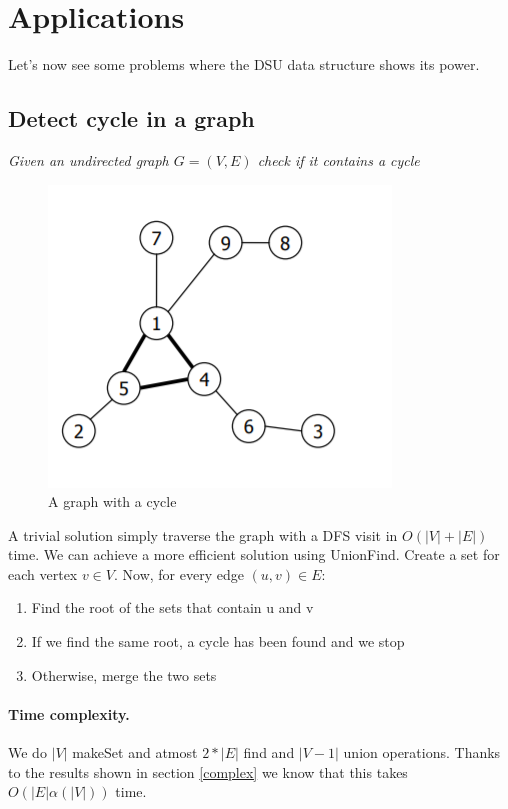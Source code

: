 \documentclass{article}
\begin{document}
\section{Applications}
Let's now see some problems where the DSU data structure shows its power.
\subsection{Detect cycle in a graph} \label{loop}
\emph{Given an undirected graph $G = (V, E)$ check if it contains a cycle}
\begin{figure}[h!]
    \centering
    \includegraphics[scale=0.5]{img/cycle.png}
    \caption{A graph with a cycle}
\end{figure}
\bigskip

A trivial solution simply traverse the graph with a DFS visit in $O(|V| + |E|)$
time. We can achieve a more efficient solution using UnionFind. Create a set for each
vertex $v \in V$. Now, for every edge $ (u,v) \in E$:\begin{enumerate}
    \item Find the root  of the sets that contain u and v
    \item If we find  the same root, a cycle has been found and we stop 
    \item Otherwise, merge the two sets
\end{enumerate}

\paragraph{Time complexity.} We do $|V|$ makeSet  and atmost $2*|E|$ find and $|V - 1|$ union operations.
Thanks  to the results shown in section \ref{complex} we know that this takes $O(|E|\alpha(|V|))$ time. 
\end{document}
